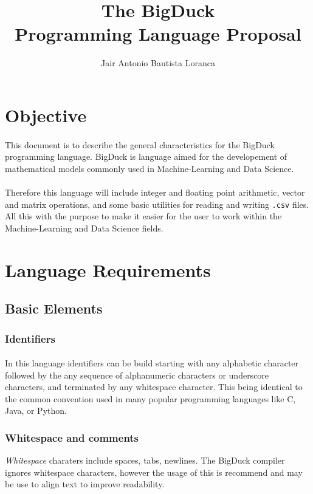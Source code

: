\documentclass[12pt, titlepage]{article}
\title{The BigDuck\\Programming Language Proposal}
\author{Jair Antonio Bautista Loranca}
\begin{document}
\maketitle
\tableofcontents

\section{Objective}
\paragraph{} This document is to describe the general characteristics for the
BigDuck programming language. BigDuck is language aimed for the developement of
mathematical models commonly used in Machine-Learning and Data Science.

\paragraph{} Therefore this language will include integer and floating point
arithmetic, vector and matrix operations, and some basic utilities for reading
and writing \texttt{.csv} files. All this with the purpose to make it easier
for the user to work within the Machine-Learning and Data Science fields.

\section{Language Requirements}
\subsection{Basic Elements}
\subsubsection{Identifiers}
\paragraph{} In this language identifiers can be build starting with any
alphabetic character followed by the any sequence of alphanumeric characters or
underscore characters, and terminated by any whitespace character. This being
identical to the common convention used in many popular programming languages
like C, Java, or Python.

\newpage

\subsubsection{Whitespace and comments}
\emph{Whitespace} charaters include spaces, tabs, newlines. The BigDuck
compiler ignores whitespace characters, however the usage of this is recommend 
and may be use to align text to improve readability.
\end{document}
